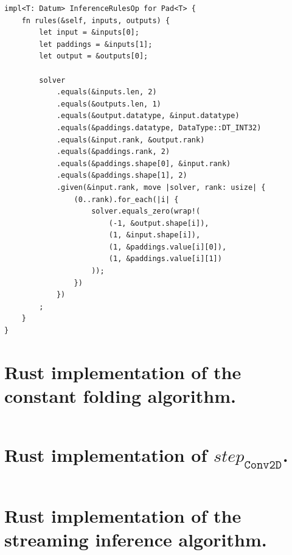 \begin{verbatim}
impl<T: Datum> InferenceRulesOp for Pad<T> {
    fn rules(&self, inputs, outputs) {
        let input = &inputs[0];
        let paddings = &inputs[1];
        let output = &outputs[0];

        solver
            .equals(&inputs.len, 2)
            .equals(&outputs.len, 1)
            .equals(&output.datatype, &input.datatype)
            .equals(&paddings.datatype, DataType::DT_INT32)
            .equals(&input.rank, &output.rank)
            .equals(&paddings.rank, 2)
            .equals(&paddings.shape[0], &input.rank)
            .equals(&paddings.shape[1], 2)
            .given(&input.rank, move |solver, rank: usize| {
                (0..rank).for_each(|i| {
                    solver.equals_zero(wrap!(
                        (-1, &output.shape[i]),
                        (1, &input.shape[i]),
                        (1, &paddings.value[i][0]),
                        (1, &paddings.value[i][1])
                    ));
                })
            })
        ;
    }
}
\end{verbatim}

\newpage
\section{Rust implementation of the constant folding algorithm.}
\label{appendix-analyser-constants}
\inputminted{rust}{analyser-constants.rs}

\newpage
\section{Rust implementation of $step_\texttt{Conv2D}$.}
\label{appendix-streaming-conv2d}

\inputminted{rust}{streaming-conv2d.rs}
\bigskip
{}

\newpage
\section{Rust implementation of the streaming inference algorithm.}
\label{appendix-streaming-algorithm}

\inputminted{rust}{streaming-algorithm.rs}
\bigskip
{}
